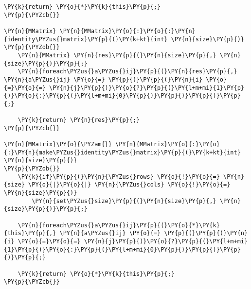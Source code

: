 \begin{Verbatim}[commandchars=\\\{\}]
	\PY{k}{return} \PY{o}{*}\PY{k}{this}\PY{p}{;}
\PY{p}{\PYZcb{}}

\PY{n}{MMatrix} \PY{n}{MMatrix}\PY{o}{:}\PY{o}{:}\PY{n}{identity\PYZus{}matrix}\PY{p}{(}\PY{k+kt}{int} \PY{n}{size}\PY{p}{)}
\PY{p}{\PYZob{}}
	\PY{n}{MMatrix} \PY{n}{res}\PY{p}{(}\PY{n}{size}\PY{p}{,} \PY{n}{size}\PY{p}{)}\PY{p}{;}
	\PY{n}{foreach\PYZus{}a\PYZus{}ij}\PY{p}{(}\PY{n}{res}\PY{p}{,} \PY{n}{a\PYZus{}ij} \PY{o}{=} \PY{p}{(}\PY{p}{(}\PY{n}{i} \PY{o}{=}\PY{o}{=} \PY{n}{j}\PY{p}{)}\PY{o}{?}\PY{p}{(}\PY{l+m+mi}{1}\PY{p}{)}\PY{o}{:}\PY{p}{(}\PY{l+m+mi}{0}\PY{p}{)}\PY{p}{)}\PY{p}{)}\PY{p}{;}

	\PY{k}{return} \PY{n}{res}\PY{p}{;}
\PY{p}{\PYZcb{}}

\PY{n}{MMatrix}\PY{o}{\PYZam{}} \PY{n}{MMatrix}\PY{o}{:}\PY{o}{:}\PY{n}{make\PYZus{}identity\PYZus{}matrix}\PY{p}{(}\PY{k+kt}{int} \PY{n}{size}\PY{p}{)}
\PY{p}{\PYZob{}}
	\PY{k}{if}\PY{p}{(}\PY{n}{\PYZus{}rows} \PY{o}{!}\PY{o}{=} \PY{n}{size} \PY{o}{|}\PY{o}{|} \PY{n}{\PYZus{}cols} \PY{o}{!}\PY{o}{=} \PY{n}{size}\PY{p}{)}
		\PY{n}{set\PYZus{}size}\PY{p}{(}\PY{n}{size}\PY{p}{,} \PY{n}{size}\PY{p}{)}\PY{p}{;}

	\PY{n}{foreach\PYZus{}a\PYZus{}ij}\PY{p}{(}\PY{o}{*}\PY{k}{this}\PY{p}{,} \PY{n}{a\PYZus{}ij} \PY{o}{=} \PY{p}{(}\PY{p}{(}\PY{n}{i} \PY{o}{=}\PY{o}{=} \PY{n}{j}\PY{p}{)}\PY{o}{?}\PY{p}{(}\PY{l+m+mi}{1}\PY{p}{)}\PY{o}{:}\PY{p}{(}\PY{l+m+mi}{0}\PY{p}{)}\PY{p}{)}\PY{p}{)}\PY{p}{;}

	\PY{k}{return} \PY{o}{*}\PY{k}{this}\PY{p}{;}
\PY{p}{\PYZcb{}}


\end{Verbatim}
